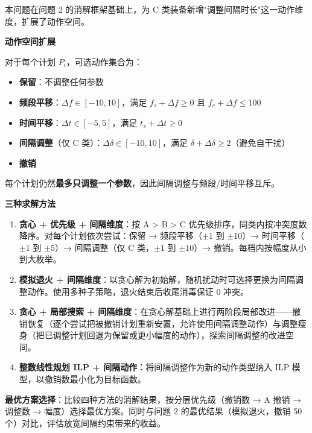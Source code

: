 
本问题在问题 2 的消解框架基础上，为 C 类装备新增"调整间隔时长"这一动作维度，扩展了动作空间。

\textbf{动作空间扩展}

对于每个计划 $P_i$，可选动作集合为：
\begin{itemize}
    \item \textbf{保留}：不调整任何参数
    \item \textbf{频段平移}：$\Delta f \in [-10, 10]$，满足 $f_s + \Delta f \geq 0$ 且 $f_e + \Delta f \leq 100$
    \item \textbf{时间平移}：$\Delta t \in [-5, 5]$，满足 $t_s + \Delta t \geq 0$
    \item \textbf{间隔调整}（仅 C 类）：$\Delta \delta \in [-10, 10]$，满足 $\delta + \Delta \delta \geq 2$（避免自干扰）
    \item \textbf{撤销}
\end{itemize}

每个计划仍然\textbf{最多只调整一个参数}，因此间隔调整与频段/时间平移互斥。

\textbf{三种求解方法}

\begin{enumerate}
    \item \textbf{贪心 + 优先级 + 间隔维度}：按 A > B > C 优先级排序，同类内按冲突度数降序。对每个计划依次尝试：保留 → 频段平移（$\pm 1$ 到 $\pm 10$）→ 时间平移（$\pm 1$ 到 $\pm 5$）→ 间隔调整（仅 C 类，$\pm 1$ 到 $\pm 10$）→ 撤销。每档内按幅度从小到大枚举。

    \item \textbf{模拟退火 + 间隔维度}：以贪心解为初始解，随机扰动时可选择更换为间隔调整动作。使用多种子策略，退火结束后收尾消毒保证 0 冲突。

    \item \textbf{贪心 + 局部搜索 + 间隔维度}：在贪心解基础上进行两阶段局部改进——撤销恢复（逐个尝试把被撤销计划重新安置，允许使用间隔调整动作）与调整瘦身（把已调整计划回退为保留或更小幅度的动作），探索间隔调整的改进空间。

    \item \textbf{整数线性规划 ILP + 间隔动作}：将间隔调整作为新的动作类型纳入 ILP 模型，以撤销数最小化为目标函数。
\end{enumerate}

\textbf{最优方案选择}：比较四种方法的消解结果，按分层优先级（撤销数 → A 撤销 → 调整数 → 幅度）选择最优方案。同时与问题 2 的最优结果（模拟退火，撤销 50 个）对比，评估放宽间隔约束带来的收益。
